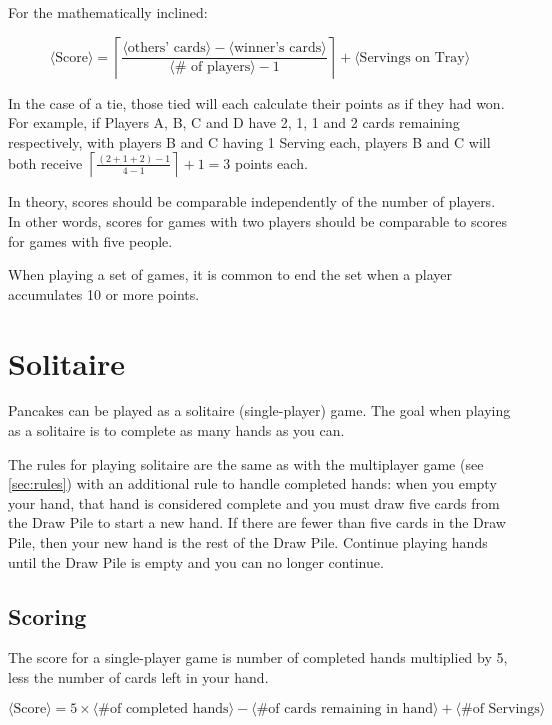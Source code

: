 \documentclass{article}
\begin{document}
For the mathematically inclined:

$$
\langle\textrm{Score}\rangle = \left\lceil\frac{\langle\textrm{others'\ cards}\rangle - \langle\textrm{winner's\ cards}\rangle}{\langle\textrm{\#\ of\ players}\rangle - 1}\right\rceil + \langle\textrm{Servings on Tray}\rangle
$$

In the case of a tie, those tied will each calculate their points as if they had won. For example, if Players A, B, C and D have 2, 1, 1 and 2 cards remaining respectively, with players B and C having 1 Serving each, players B and C will both receive $\left\lceil\frac{(2+1+2) - 1}{4 - 1}\right\rceil + 1 = 3$ points each.

In theory, scores should be comparable independently of the number of players. In other words, scores for games with two players should be comparable to scores for games with five people.

When playing a set of games, it is common to end the set when a player accumulates 10 or more points.

\pagebreak
\section{Solitaire}
\label{sec:solitaire}

Pancakes can be played as a solitaire (single-player) game. The goal when playing as a solitaire is to complete as many hands as you can.

The rules for playing solitaire are the same as with the multiplayer game (see \autoref{sec:rules}) with an additional rule to handle completed hands: when you empty your hand, that hand is considered complete and you must draw five cards from the Draw Pile to start a new hand. If there are fewer than five cards in the Draw Pile, then your new hand is the rest of the Draw Pile. Continue playing hands until the Draw Pile is empty and you can no longer continue.

\subsection{Scoring}
\label{sec:solitairescoring}

The score for a single-player game is number of completed hands multiplied by 5, less the number of cards left in your hand.

$$
\langle\textrm{Score}\rangle = 5 \times \langle\textrm{\# of completed hands}\rangle - \langle\textrm{\# of cards remaining in hand}\rangle + \langle\textrm{\# of Servings}\rangle
$$
\end{document}

